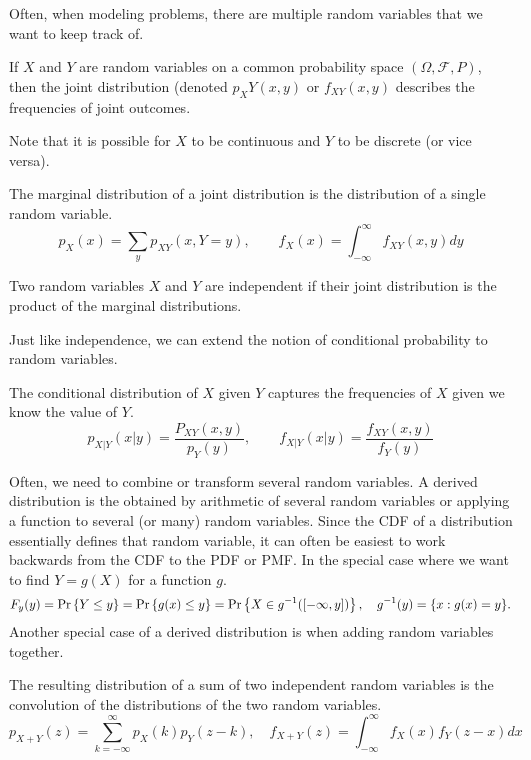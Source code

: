 Often, when modeling problems, there are multiple random variables that we want to keep track of.
\begin{definition}
  If $X$ and $Y$ are random variables on a common probability space $(\Omega, \mathcal{F}, P)$, then the joint distribution (denoted $p_XY(x, y)$ or $f_{XY}(x, y)$ describes the frequencies of joint outcomes.
  \label{defn:joint-dist}
\end{definition}
Note that it is possible for $X$ to be continuous and $Y$ to be discrete (or vice versa).
\begin{definition}
  The marginal distribution of a joint distribution is the distribution of a single random variable.
  \[
	p_X(x) = \sum_yp_{XY}(x, Y=y), \qquad f_X(x) = \int_{-\infty}^{\infty}f_{XY}(x, y)dy
  \]
  \label{defn:marginal-dist}
\end{definition}
\begin{definition}
  Two random variables $X$ and $Y$ are independent if their joint distribution is the product of the marginal distributions.
  \label{defn:rv-independence}
\end{definition}
Just like independence, we can extend the notion of conditional probability to random variables.
\begin{definition}
  The conditional distribution of $X$ given $Y$ captures the frequencies of $X$ given we know the value of $Y$.
  \[
	p_{X|Y}(x|y) = \frac{P_{XY}(x, y)}{p_Y(y)}, \qquad f_{X|Y}(x|y) = \frac{f_{XY}(x, y)}{f_Y(y)}
  \]
  \label{defn:conditional-dist}
\end{definition}
Often, we need to combine or transform several random variables.
A derived distribution is the obtained by arithmetic of several random variables or applying a function to several (or many) random variables.
Since the CDF of a distribution essentially defines that random variable, it can often be easiest to work backwards from the CDF to the PDF or PMF.
In the special case where we want to find $Y=g(X)$ for a function $g$.
\[
  F_y(y) =\text{Pr}\left\{Y \leq y\right\} = \text{Pr}\left\{g(x) \leq y\right\} = \text{Pr}\left\{X \in g^{-1}([-\infty, y])\right\}, \quad g^{-1}(y) = \{ x: g(x) = y \}.
\]
Another special case of a derived distribution is when adding random variables together.
\begin{theorem}
  The resulting distribution of a sum of two independent random variables is the convolution of the distributions of the two random variables.
  \[
	p_{X+Y}(z) = \sum_{k=-\infty}^{\infty}p_X(k)p_Y(z-k), \quad f_{X+Y}(z) = \int_{-\infty}^{\infty}f_X(x)f_Y(z - x)dx
  \]
  \label{thm:convolution}
\end{theorem}
